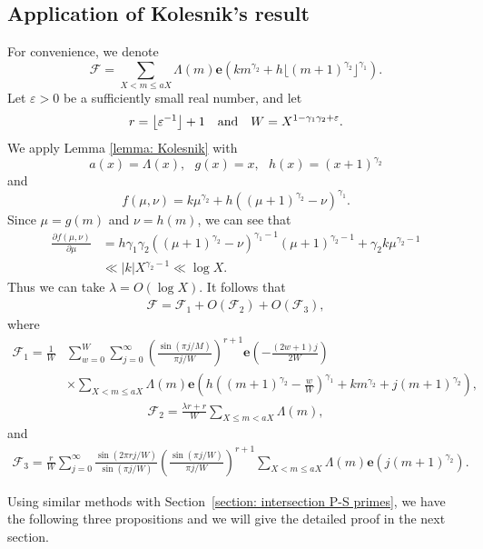 \documentclass[12pt, reqno, twoside, letterpaper]{amsart}
\numberwithin{equation}{section}
\def\fl#1{\left\lfloor#1\right\rfloor}
\newcommand{\e}{\ensuremath{\mathbf{e}}}
\newcommand{\cF}{\ensuremath{\mathcal{F}}}
\theoremstyle{customthm}
\theoremstyle{customrem}
\begin{document}
\subsection{Application of Kolesnik's result}



For convenience, we denote
$$
\cF=\sum_{X < m \leqslant aX}\Lambda(m)
\e (km^{\gamma_2} + h\lfloor(m+1)^{\gamma_2}\rfloor^{\gamma_1}).
$$
Let $\varepsilon>0$ be a sufficiently small real number, and let
$$
r=\fl{\varepsilon^{-1}}+1\ \ \ \hbox{and}\ \ \ W=X^{1-\gamma_1\gamma_2+\varepsilon}.
$$
We apply Lemma \ref{lemma: Kolesnik} with
$$
a(x)=\Lambda(x),\ \ \ g(x)=x,\ \ \ h(x)=(x+1)^{\gamma_2}
$$
and
$$
f(\mu,\nu)=k\mu^{\gamma_2}+h\left((\mu+1)^{\gamma_2}-\nu\right)^{\gamma_1}.
$$
Since $\mu=g(m)$ and $\nu=h(m)$, we can see that
\begin{align*}
\frac{\partial f(\mu,\nu)}{\partial \mu}
&=h\gamma_1\gamma_2\left((\mu+1)^{\gamma_2}-\nu\right)^{\gamma_1-1}
(\mu+1)^{\gamma_2-1}+\gamma_2k\mu^{\gamma_2-1}\\
&\ll |k|X^{\gamma_2-1}\ll \log X.
\end{align*}
Thus we can take $\lambda=O\left(\log X\right)$. It follows that
\begin{align*}
\cF=\cF_1+O(\cF_2)+O(\cF_3),
\end{align*}
where
\begin{align*}
\cF_1=\frac{1}{W}&\sum_{w=0}^{W}\sum_{j=0}^{\infty}\left(\frac{\sin(\pi j/M)}{\pi j/W}\right)^{r+1}
\mathbf{e}\left(-\frac{(2w+1)j}{2W}\right)\\
&\times\sum_{X < m \leqslant aX}
\Lambda(m)\mathbf{e}\left(h\left((m+1)^{\gamma_2}-\frac{w}{W}\right)^{\gamma_1}
+km^{\gamma_2}+j(m+1)^{\gamma_2}\right),
\end{align*}
\begin{align*}
\cF_2=\frac{\lambda r+r}{W}\sum_{X\leqslant m<a X}\Lambda(m),
\end{align*}
and
\begin{align*}
\cF_3=\frac{r}{W}\sum_{j=0}^{\infty}\frac{\sin(2\pi rj/W)}{\sin(\pi j/W)}
\left(\frac{\sin(\pi j/W)}{\pi j/W}\right)^{r+1}
\sum_{X < m \leqslant aX}\Lambda(m)\mathbf{e}\left(j (m+1)^{\gamma_2}\right).
\end{align*}

Using similar methods with Section~\ref{section: intersection P-S primes}, we have the following three propositions and we will give the detailed proof in the next section.
\end{document}
